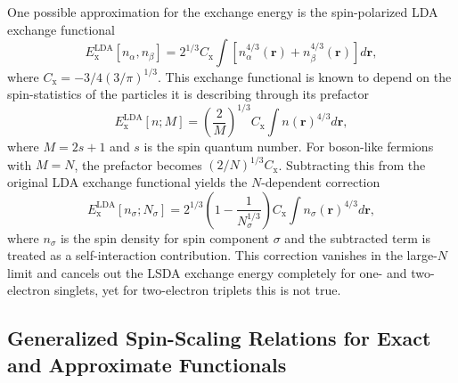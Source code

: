 \documentclass[%
 reprint,
 amsmath,amssymb,
 aps,
pra,
]{revtex4-2}
\begin{document}
One possible approximation for the exchange energy is the spin-polarized LDA exchange functional
\begin{equation}
    E_{\text{x}}^{\text{LDA}}[n_{\alpha}, n_{\beta}]
    =
    2^{1/3}
    C_{\text{x}}
    \int
    \left[
    n^{4/3}_{\alpha}(\mathbf{r}) + n^{4/3}_{\beta}(\mathbf{r})
    \right]
    d\mathbf{r},
    \label{eq: LDA Exchange}
\end{equation}
where $C_{\text{x}}=-3/4(3/\pi)^{1/3}$. This exchange functional is known to depend on the spin-statistics of the particles it is describing through its prefactor
\begin{equation}
    E_{\text{x}}^{\text{LDA}}[n; M]
    =
    \left(
    \frac{2}{M}
    \right)^{1/3}
    C_{\text{x}}
    \int
    n(\mathbf{r})^{4/3}
    d\mathbf{r},
\end{equation}
where $M = 2s+1$ and $s$ is the spin quantum number. For boson-like fermions with $M=N$, the prefactor becomes $(2/N)^{1/3}C_{\text{x}}$. Subtracting this from the original LDA exchange functional yields the $N$-dependent correction
\begin{equation}
    E_{\text{x}}^{\text{LDA}}[n_{\sigma}; N_{\sigma}]
    =
    2^{1/3}
    \left(
    1
    -
    \frac{1}{N^{1/3}_{\sigma}}
    \right)
    C_{\text{x}}
    \int
    n_{\sigma}(\mathbf{r})^{4/3}
    d\mathbf{r},
\end{equation}
where $n_{\sigma}$ is the spin density for spin component $\sigma$ and the subtracted term is treated as a self-interaction contribution. This correction vanishes in the large-$N$ limit and cancels out the LSDA exchange energy completely for one- and two-electron singlets, yet for two-electron triplets this is not true. 

\subsection{Generalized Spin-Scaling Relations for Exact and Approximate Functionals}
\end{document}
